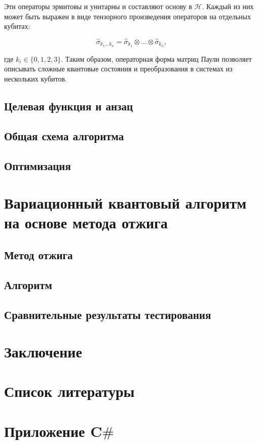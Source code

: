 \documentclass[a4paper]{report}
\begin{document}
Эти операторы эрмитовы и унитарны и составляют основу в $\mathcal{H}$. Каждый из них может быть выражен в виде тензорного произведения операторов на отдельных кубитах:

$$
\hat{\sigma}_{k_1\ldots k_n} = \hat{\sigma}_{k_1} \otimes \ldots \otimes \hat{\sigma}_{k_n},
$$

где $k_i \in \{0, 1, 2, 3\}$. Таким образом, операторная форма матриц Паули позволяет описывать сложные квантовые состояния и преобразования в системах из нескольких кубитов.

\section{Целевая функция и анзац}

\section{Общая схема алгоритма}

\section{Оптимизация}

\chapter{Вариационный квантовый алгоритм на основе метода отжига}

\section{Метод отжига}

\section{Алгоритм}

\section{Сравнительные результаты тестирования}

\chapter*{Заключение}

\chapter*{Список литературы}

\chapter*{Приложение C{$\#$}}
\end{document}
